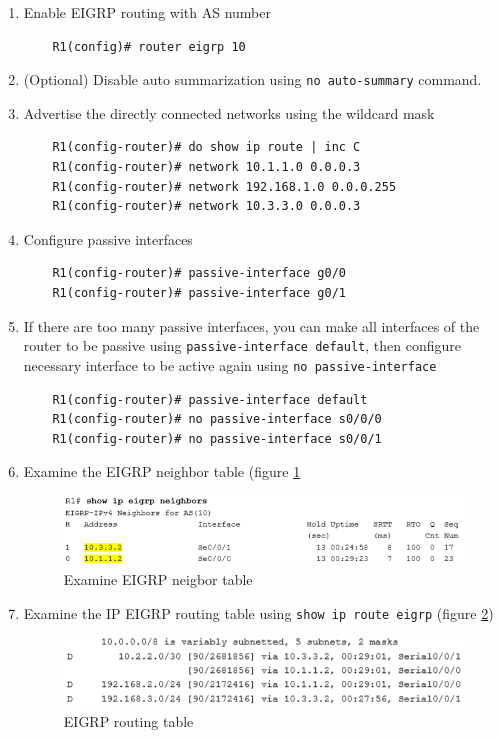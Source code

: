 \begin{enumerate}
\item Enable EIGRP routing with AS number
	\begin{verbatim}
	R1(config)# router eigrp 10
	\end{verbatim}
	
\item (Optional) Disable auto summarization using \verb|no auto-summary| command.
	
\item Advertise the directly connected networks using the wildcard mask
	\begin{verbatim}
	R1(config-router)# do show ip route | inc C
	R1(config-router)# network 10.1.1.0 0.0.0.3
	R1(config-router)# network 192.168.1.0 0.0.0.255 
	R1(config-router)# network 10.3.3.0 0.0.0.3
	\end{verbatim}
	
\item Configure passive interfaces 
	\begin{verbatim}
	R1(config-router)# passive-interface g0/0
	R1(config-router)# passive-interface g0/1
	\end{verbatim}
	
\item If there are too many passive interfaces, you can make all interfaces of the router to be passive using \verb|passive-interface default|, then configure necessary interface to be active again using \verb|no passive-interface|
	\begin{verbatim}
	R1(config-router)# passive-interface default
	R1(config-router)# no passive-interface s0/0/0
	R1(config-router)# no passive-interface s0/0/1
	\end{verbatim}

\item Examine the EIGRP neighbor table (figure \ref{neigborTable}
	\begin{figure}[hbtp]
	\caption{Examine EIGRP neigbor table}\label{neigborTable}
	\centering
	\includegraphics[scale=0.8]{pictures/neigborTable.PNG}
	\end{figure}
	
\item Examine the IP EIGRP routing table using \verb|show ip route eigrp| (figure \ref{EIGRProutingTable})
	\begin{figure}[hbtp]
		\caption{EIGRP routing table}\label{EIGRProutingTable}
		\centering
		\includegraphics[scale=0.8]{pictures/EIGRProutingTable.PNG}
		\end{figure}


\end{enumerate}
